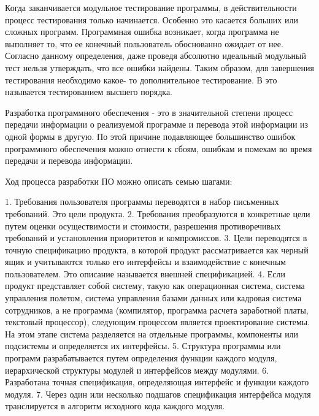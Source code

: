 Когда заканчивается модульное тестирование программы, в действительности процесс тестирования 
только начинается. Особенно это касается больших или сложных программ. Программная ошибка возникает, когда программа не выполняет то, что ее конечный пользователь обоснованно ожидает от 
нее. Согласно данному определения, даже проведя абсолютно идеальный модульный тест нельзя 
утверждать, что все ошибки найдены. Таким образом, для завершения тестирования необходимо какое-
то дополнительное тестирование. В\cite{Myers2004} это называется тестированием высшего 
порядка.

Разработка программного обеспечения - это в значительной степени процесс передачи информации о 
реализуемой программе и перевода этой информации из одной формы в другую. По этой причине 
подавляющее большинство ошибок программного обеспечения можно отнести к сбоям, ошибкам и 
помехам во время передачи и перевода информации.

Ход процесса разработки ПО можно описать семью шагами:

1. Требования пользователя программы переводятся в набор письменных требований. Это цели продукта.
2. Требования преобразуются в конкретные цели путем оценки осуществимости и стоимости, разрешения противоречивых требований и установления приоритетов и компромиссов.
3. Цели переводятся в точную спецификацию продукта, в которой продукт рассматривается как черный ящик и учитываются только его интерфейсы и взаимодействие с конечным пользователем. Это описание называется внешней спецификацией.
4. Если продукт представляет собой систему, такую как операционная система, система управления полетом, система управления базами данных или кадровая система сотрудников, а не программа (компилятор, программа расчета заработной платы, текстовый процессор), следующим процессом является проектирование системы. На этом этапе система разделяется на отдельные программы, компоненты или подсистемы и определяется их интерфейсы.
5. Структура программы или программ разрабатывается путем определения функции каждого модуля, иерархической структуры модулей и интерфейсов между модулями.
6. Разработана точная спецификация, определяющая интерфейс и функции каждого модуля.
7. Через один или несколько подшагов спецификация интерфейса модуля транслируется в алгоритм исходного кода каждого модуля.


